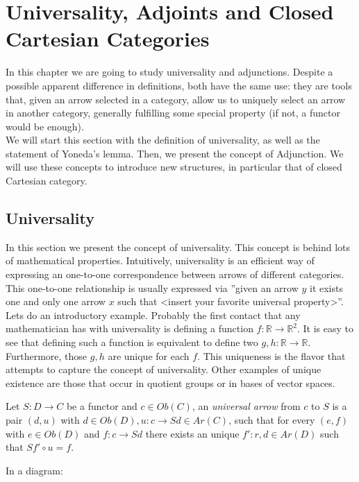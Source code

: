 
\chapter{Universality, Adjoints and Closed Cartesian Categories}

In this chapter we are going to study universality and adjunctions. Despite a possible apparent difference in definitions, both have the same use: they are tools that, given an arrow selected in a category, allow us to uniquely select an arrow in another category, generally fulfilling some special property (if not, a functor would be enough). \\

We will start this section with the definition of universality, as well as the statement of Yoneda's lemma. Then, we present the concept of Adjunction. We will use these concepts to introduce new structures, in particular that of closed Cartesian category.


\section{Universality}
In this section we present the concept of universality. This concept is behind lots of mathematical properties. Intuitively, universality is an efficient way of expressing an one-to-one correspondence between arrows of different categories. This one-to-one relationship is usually expressed via ''given an arrow  $y$ it exists one and only one  arrow $x$ such that <insert your favorite universal property>''.\\

Lets do an introductory example. Probably the first contact that any mathematician has with universality is defining a function  $f:\mathbb R \to \mathbb R^2$. It is easy to see that defining such a function is equivalent to define two $g,h: \mathbb R \to \mathbb R$. Furthermore, those $g,h$ are unique for each $f$. This uniqueness is the flavor that attempts to capture the concept of universality. Other examples of unique existence are those that occur in quotient groups or in bases of vector spaces. \\

\begin{definition}\label{def:univ-arrow}
  Let $S: D \to C$ be a functor and $c \in Ob(C)$, an \emph{universal arrow}  from $c$ to $S$ is a pair $(d,u)$ with $d\in Ob(D), u:c \to Sd \in Ar(C)$, such that for every $(e,f)$ with $e\in Ob(D)$  and $f:c\to Sd$ there exists an unique $f':r,d\in Ar(D)$ such that $Sf'\circ u = f$.

\end{definition}
In a diagram:

